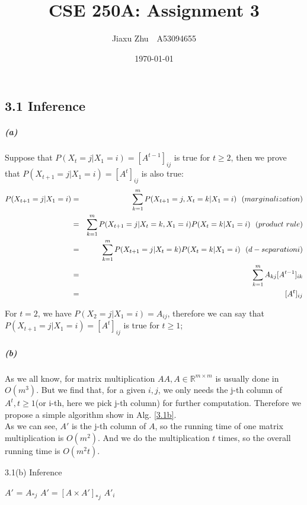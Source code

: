 \documentclass{article}
\newcommand{\RNum}[1]{\uppercase\expandafter{\romannumeral #1\relax}}
\begin{document}
\title{CSE 250A: Assignment 3}
\author{Jiaxu Zhu~~A53094655}
\date{\today}
\maketitle
\subsection*{3.1 Inference}
\subparagraph*{(a)}
Suppose that $P(X_{t} =j|X_1 =i)=[A^{t-1}]_{ij}$ is true for $t \ge 2$, then we prove that $P(X_{t+1} =j|X_1 =i)=[A^{t}]_{ij}$ is also true:
\begin{eqnarray*}
P(X_{t+1} =j|X_1 =i) &=& \sum_{k=1}^{m}P(X_{t+1} =j,X_{t}=k|X_1 =i)~~(marginalization)\\
&=& \sum_{k=1}^{m}P(X_{t+1} =j|X_{t}=k,X_1 =i)P(X_{t}=k|X_1 =i)~~(product~rule)\\
&=& \sum_{k=1}^{m}P(X_{t+1} =j|X_{t}=k)P(X_{t}=k|X_1 =i)~~(d-separation \RNum{1})\\
&=&\sum_{k=1}^{m}A_{kj}[A^{t-1}]_{ik}\\
&=&[A^{t}]_{ij}
\end{eqnarray*}

For $t=2$, we have $P(X_{2} =j|X_1 =i)=A_{ij}$, therefore we can say that $P(X_{t+1} =j|X_1 =i)=[A^{t}]_{ij}$ is true for $t \ge 1$;

\subparagraph*{(b)}
As we all know, for matrix multiplication $AA, A \in \mathbb{R}^{m \times m}$ is usually done in $O(m^3)$. But we find that, for a given $i,j$, we only needs the j-th column of $A^t, t \ge 1$(or i-th, here we pick j-th column) for further computation. Therefore we propose a simple algorithm show in Alg. \ref{3.1b}.\\

As we can see, $A'$ is the j-th column of $A$, so the running time of one matrix multiplication is $O(m^2)$. And we do the multiplication $t$ times, so the overall running time is $O(m^2t)$. 

\begin{algorithm}[h]
	\caption{3.1(b) Inference}\label{3.1b}
	\begin{algorithmic}[1]
		\State $A'$ = $A_{*j}$
			\State $A' = [A \times A']_{*j}$ 
		\EndFor
		\State \Return $A'_i$
		\EndFunction
	\end{algorithmic}
\end{algorithm}
\end{document}
